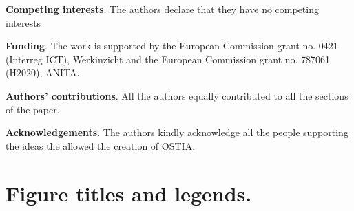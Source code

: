 \documentclass[smallextended]{svjour3}       %
\begin{document}
		
\medskip		
\noindent
\textbf{Competing interests}.
The authors declare that they have no competing interests

\medskip
\noindent
\textbf{Funding}.
The work is supported by the European Commission grant no. 0421 (Interreg ICT), Werkinzicht and the European Commission grant no. 787061 (H2020), ANITA.

\medskip
\noindent
\textbf{Authors' contributions}.
All the authors equally contributed to all the sections of the paper.

\medskip
\noindent
\textbf{Acknowledgements}.
The authors kindly acknowledge all the people supporting the ideas the allowed the creation of OSTIA.







\section{Figure titles and legends.}
\listoffigures
\end{document}

